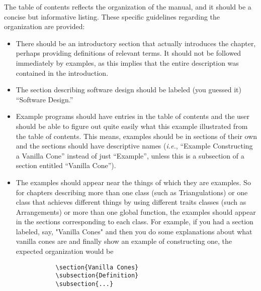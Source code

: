 The table of contents reflects the organization of the manual, and it 
should be a concise but informative listing. These specific guidelines 
regarding the organization are provided:
\begin{itemize}
   \item There should be an introductory section that actually introduces
         the chapter, perhaps providing definitions of relevant terms.  
         It should not be followed immediately by examples, as this implies 
         that the entire description was contained in the introduction.

   \item The section describing software design should be labeled (you guessed 
         it) ``Software Design.'' 

   \item Example programs should have entries in the table of contents and
         the user should be able to figure out quite easily what this example
         illustrated from the table of contents.  This means, examples should
         be in sections of their own and the sections should have descriptive 
         names (\textit{i.e.}, ``Example Constructing a Vanilla Cone'' instead 
         of just ``Example'', unless this is a subsection of a section
         entitled ``Vanilla Cone'').

   \item The examples should appear near the things of which they are 
         examples.  So for chapters describing more than one class (such as 
         Triangulations) or one class that achieves different things by using 
         different traits classes (such as Arrangements) or more than one
         global function, the examples should appear in the sections 
         corresponding to each class.  For example, if you had a 
         section labeled, say, "Vanilla Cones" and then you do some 
         explanations about what vanilla cones are and finally show an example 
         of constructing one, the expected organization would be 
         \begin{verbatim}
           \section{Vanilla Cones}
           \subsection{Definition}
           \subsection{...}

\end{verbatim}
\end{itemize}
